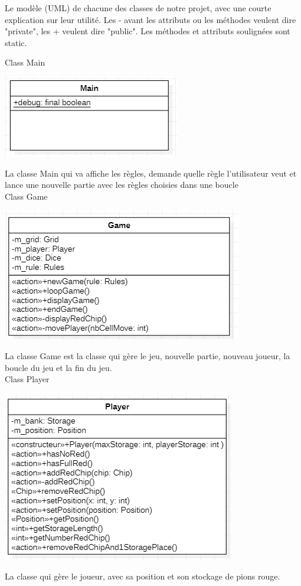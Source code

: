 \usepackage{graphicx}
Le modèle (UML) de chacune des classes de notre projet, avec une courte explication sur leur utilité.
Les - avant les attributs ou les méthodes veulent dire "private",
les + veulent dire "public".
Les méthodes et attributs soulignées sont static. 


Class Main
\begin{center}
\includegraphics{Main.png}
\end{center}
La classe Main qui va affiche les règles, demande quelle règle l'utilisateur veut et lance une nouvelle partie avec les règles choisies dans une boucle \\

Class Game
\begin{center}
\includegraphics{Game.png}
\end{center}
La classe Game est la classe qui gère le jeu, nouvelle partie, nouveau joueur, la boucle du jeu et la fin du jeu.\\


Class Player
\begin{center}
\includegraphics{Player.png}
\end{center}
La classe qui gère le joueur, avec sa position et son stockage de pions rouge. \\

